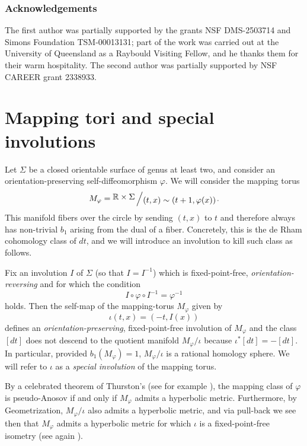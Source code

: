 \documentclass[11pt]{amsart}
\theoremstyle{definition}
\theoremstyle{remark}
\newcommand{\bigslant}[2]{{\raisebox{.2em}{$#1$}\left/\raisebox{-.2em}{$#2$}\right.}}
\begin{document}
\subsubsection*{Acknowledgements} The first author was partially supported by the grants NSF DMS-2503714 and Simons Foundation TSM-00013131; part of the work was carried out at the University of Queensland as a Raybould Visiting Fellow, and he thanks them for their warm hospitality. The second author was partially supported by NSF CAREER grant 2338933.


\section{Mapping tori and special involutions}

Let $\Sigma$ be a closed orientable surface of genus at least two, and consider an orientation-preserving self-diffeomorphism $\varphi$. We will consider the mapping torus
\begin{equation*}
M_\varphi=\bigslant{\mathbb{R}\times\Sigma}{(t,x)\sim(t+1,\varphi(x))}.
\end{equation*}
This manifold fibers over the circle by sending $(t,x)$ to $t$ and therefore always has non-trivial $b_1$ arising from the dual of a fiber. Concretely, this is the de Rham cohomology class of $dt$, and we will introduce an involution to kill such class as follows.
\par
Fix an involution $I$ of $\Sigma$ (so that $I=I^{-1}$) which is fixed-point-free, \textit{orientation-reversing} and for which the condition
\begin{equation}\label{conj}
I\circ\varphi\circ I^{-1}=\varphi^{-1}
\end{equation}
holds. Then the self-map of the mapping-torus $M_\varphi$ given by
\begin{equation*}
\iota(t,x)=(-t,I(x))
\end{equation*}
defines an \textit{orientation-preserving}, fixed-point-free involution of $M_{\varphi}$ and the class $[dt]$ does not descend to the quotient manifold $M_{\varphi}/\iota$ because $\iota^\ast [dt] = -[dt]$. In particular, provided $b_1(M_{\varphi})=1$, $M_{\varphi}/\iota$ is a rational homology sphere. We will refer to $\iota$ as a \textit{special involution} of the mapping torus.
\par
By a celebrated theorem of Thurston's (see for example \cite{Mar}), the mapping class of $\varphi$ is pseudo-Anosov if and only if $M_\varphi$ admits a hyperbolic metric. Furthermore, by Geometrization, $M_\varphi/\iota$ also admits a hyperbolic metric, and via pull-back we see then that $M_\varphi$ admits a hyperbolic metric for which $\iota$ is a fixed-point-free isometry (see again \cite{Mar}). 
\end{document}
